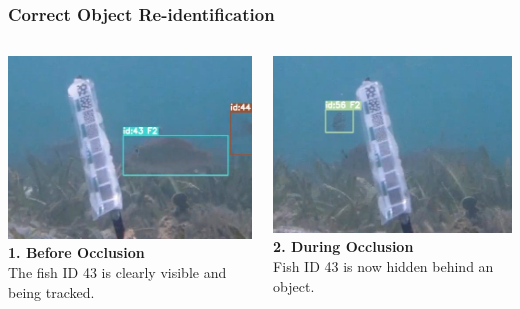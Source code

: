 \documentclass[serif]{beamer}  %
\begin{document}
\begin{frame}
    \frametitle{Correct Object Re-identification}
    
    \begin{columns}[T,totalwidth=\textwidth] 
        \begin{column}{0.32\textwidth}
            \centering
            \includegraphics[width=\linewidth]{images/occlusion_1.png}
            \vspace{0.5em}
            \tiny
            \textbf{1. Before Occlusion} \\
            The fish ID 43 is clearly visible and being tracked.
        \end{column}
        
        \begin{column}{0.32\textwidth}
            \centering
            \includegraphics[width=\linewidth]{images/occlusion_2.png}
            \vspace{0.5em}
            \tiny
            \textbf{2. During Occlusion} \\
            Fish ID 43 is now hidden behind an object.
        \end{column}
        

\end{columns}
\end{frame}
\end{document}
